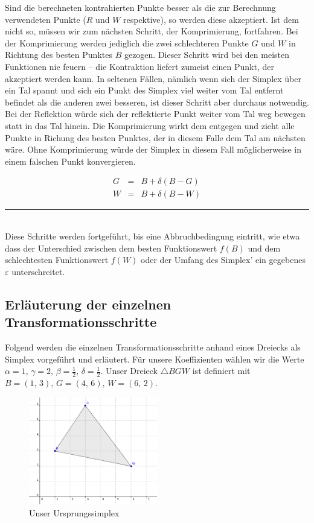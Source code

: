 \documentclass[naustrian]{article}
\begin{document}
Sind die berechneten kontrahierten Punkte besser als die zur Berechnung
verwendeten Punkte ($R$ und $W$ respektive), so werden diese akzeptiert.  Ist
dem nicht so, müssen wir zum nächsten Schritt, der Komprimierung, fortfahren.
Bei der Komprimierung werden jediglich die zwei schlechteren Punkte $G$ und $W$
in Richtung des besten Punktes $B$ gezogen. \cite{nelder-mead-scholarpedia}
Dieser Schritt wird bei den meisten Funktionen nie feuern -- die Kontraktion
liefert zumeist einen Punkt, der akzeptiert werden kann. In seltenen Fällen,
nämlich wenn sich der Simplex über ein Tal spannt und sich ein Punkt des
Simplex viel weiter vom Tal entfernt befindet als die anderen zwei besseren,
ist dieser Schritt aber durchaus notwendig.
Bei der Reflektion würde sich der reflektierte Punkt weiter vom Tal weg bewegen
statt in das Tal hinein. Die Komprimierung wirkt dem entgegen und zieht alle
Punkte in Richung des besten Punktes, der in diesem Falle dem Tal am nächsten
wäre. Ohne Komprimierung würde der Simplex in diesem Fall möglicherweise in
einem falschen Punkt konvergieren.

\begin{eqnarray*}
    G & = & B+\delta(B-G)\\
    W & = & B+\delta(B-W)
\end{eqnarray*}
\rule[0.5ex]{1\columnwidth}{0.5pt}\\

Diese Schritte werden fortgeführt, bis eine Abbruchbedingung eintritt, wie etwa
dass der Unterschied zwischen dem besten Funktionswert $f(B)$ und dem
schlechtesten Funktionswert $f(W)$ oder der Umfang des Simplex' ein gegebenes
$\varepsilon$ unterschreitet.

\subsection{Erläuterung der einzelnen Transformationsschritte}

Folgend werden die einzelnen Transformationsschritte anhand eines
Dreiecks als Simplex vorgeführt und erläutert. Für unsere Koeffizienten
wählen wir die Werte $\alpha=1,\,\gamma=2,\,\beta=\frac{1}{2},\,\delta=\frac{1}{2}$.
Unser Dreieck $\triangle BGW$ ist definiert mit $B=(1,\,3),\,G=(4,\,6),\,W=(6,\,2)$.

\begin{figure}[h]
    \centering
    \includegraphics[width=0.5\textwidth]{nelder_mead/triangle_bgw}
    \caption{Unser Ursprungssimplex}
\end{figure}
\end{document}
